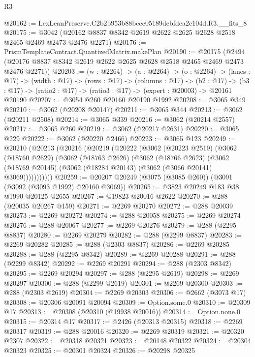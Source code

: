 \begin{lexlean}{R3}
\begin{coremodule}
@20162 := LexLeanPreserve.C2b2b953b88bccc05189debfdea2e104d.R3.__fits_8
@20175 := @3042 (@20162 @8837 @8342 @2619 @2622 @2625 @2628 @2518 @2465 @2469 @2473 @2476 @2271)
@20176 := PrismTemplateContract.QuantizedMatrix.makePlan
@20190 := @20175
    (@2494 (@20176 @8837 @8342 @2619 @2622 @2625 @2628 @2518 @2465 @2469 @2473 @2476 @2271))
@20203 := (w : @2264) ->
  (a : @2264) ->
  (o : @2264) ->
  (lanes : @17) ->
  (width : @17) ->
  (rows : @17) ->
  (columns : @17) ->
  (b2 : @17) -> (b3 : @17) -> (ratio2 : @17) -> (ratio3 : @17) -> (expert : @20003) -> @20161 @20190
@20207 := @3054 @260 @20160 @20190 @1992
@20208 := @3065 @349
@20210 := @3062 (@20208 @20147)
@20211 := @3065 @344
@20213 := @3062 (@20211 @2508)
@20214 := @3065 @339
@20216 := @3062 (@20214 @2557)
@20217 := @3065 @260
@20219 := @3062 (@20217 @2631)
@20220 := @3065 @229
@20222 := @3062 (@20220 @2466)
@20223 := @3065 @123
@20249 := @20210
    (@20213
      (@20216
        (@20219
          (@20222
            (@3062
              (@20223 @2519)
              (@3062
                (@18760 @2629)
                (@3062
                  (@18763 @2626)
                  (@3062
                    (@18766 @2623)
                    (@3062
                      (@18769 @20145)
                      (@3062 (@18284 @20143) (@3062 (@3066 @20141) @3069)))))))))))
@20259 := @20207 @20249 (@3075 (@3085 @260)) (@3091 (@3092 (@3093 @1992) @20160 @3069))
@20265 := @3823 @20249 @183 @38 @1990 @20125 @2655
@20267 := @19823 @20016 @2622
@20270 := @288 (@20035 @20267 @159)
@20271 := @2269 @20270
@20272 := @288 @20039
@20273 := @2269 @20272
@20274 := @288 @20058
@20275 := @2269 @20274
@20276 := @288 @20067
@20277 := @2269 @20276
@20279 := @288 (@2295 @8837)
@20280 := @2269 @20279
@20282 := @288 (@2299 @8837)
@20283 := @2269 @20282
@20285 := @288 (@2303 @8837)
@20286 := @2269 @20285
@20288 := @288 (@2295 @8342)
@20289 := @2269 @20288
@20291 := @288 (@2299 @8342)
@20292 := @2269 @20291
@20294 := @288 (@2303 @8342)
@20295 := @2269 @20294
@20297 := @288 (@2295 @2619)
@20298 := @2269 @20297
@20300 := @288 (@2299 @2619)
@20301 := @2269 @20300
@20303 := @288 (@2303 @2619)
@20304 := @2269 @20303
@20306 := @2662 (@3073 @17)
@20308 := @20306 @20091 @20094
@20309 := Option.some.{0}
@20310 := @20309 @17
@20313 := @20308 (@20310 (@19938 @20016))
@20314 := Option.none.{0}
@20315 := @20314 @17
@20317 := @2426 (@20313 @20315)
@20318 := @2269 @20317
@20319 := @288 @20016
@20320 := @2269 @20319
@20321 := @20320 @2307
@20322 := @20318 @20321
@20323 := @20148 @20322
@20324 := @20304 @20323
@20325 := @20301 @20324
@20326 := @20298 @20325

\end{coremodule}
\end{lexlean}
